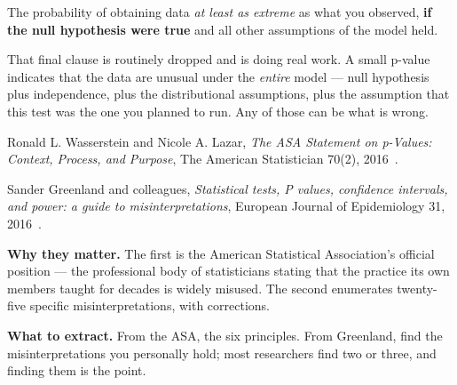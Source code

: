 \begin{definitionbox}
The probability of obtaining data \emph{at least as extreme} as what you
observed, \textbf{if the null hypothesis were true} and all other assumptions of
the model held.

\medskip
That final clause is routinely dropped and is doing real work. A small p-value
indicates that the data are unusual under the \emph{entire} model --- null
hypothesis plus independence, plus the distributional assumptions, plus the
assumption that this test was the one you planned to run. Any of those can be
what is wrong.
\end{definitionbox}

\begin{paperbox}
Ronald L. Wasserstein and Nicole A. Lazar, \emph{The ASA Statement on p-Values:
Context, Process, and Purpose}, The American Statistician 70(2),
2016~\cite{wasserstein2016asa}.\oa{}

\medskip
Sander Greenland and colleagues, \emph{Statistical tests, P values, confidence
intervals, and power: a guide to misinterpretations}, European Journal of
Epidemiology 31, 2016~\cite{greenland2016statistical}.\oa{}

\medskip
\textbf{Why they matter.} The first is the American Statistical Association's
official position --- the professional body of statisticians stating that the
practice its own members taught for decades is widely misused. The second
enumerates twenty-five specific misinterpretations, with corrections.

\medskip
\textbf{What to extract.} From the ASA, the six principles. From Greenland,
find the misinterpretations you personally hold; most researchers find two or
three, and finding them is the point.
\end{paperbox}

